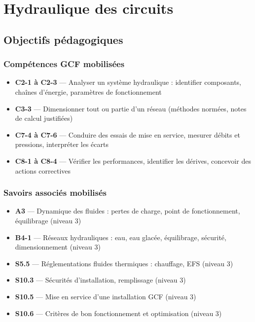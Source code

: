 \chapter{Hydraulique des circuits}

\section{Objectifs pédagogiques}

\subsection*{Compétences GCF mobilisées}
\begin{itemize}
  \item \textbf{C2-1 à C2-3} — Analyser un système hydraulique : identifier composants, chaînes d'énergie, paramètres de fonctionnement
  \item \textbf{C3-3} — Dimensionner tout ou partie d'un réseau (méthodes normées, notes de calcul justifiées)
  \item \textbf{C7-4 à C7-6} — Conduire des essais de mise en service, mesurer débits et pressions, interpréter les écarts
  \item \textbf{C8-1 à C8-4} — Vérifier les performances, identifier les dérives, concevoir des actions correctives
\end{itemize}

\subsection*{Savoirs associés mobilisés}
\begin{itemize}
  \item \textbf{A3} — Dynamique des fluides : pertes de charge, point de fonctionnement, équilibrage (niveau 3)
  \item \textbf{B4-1} — Réseaux hydrauliques : eau, eau glacée, équilibrage, sécurité, dimensionnement (niveau 3)
  \item \textbf{S5.5} — Réglementations fluides thermiques : chauffage, EFS (niveau 3)
  \item \textbf{S10.3} — Sécurités d'installation, remplissage (niveau 3)
  \item \textbf{S10.5} — Mise en service d'une installation GCF (niveau 3)
  \item \textbf{S10.6} — Critères de bon fonctionnement et optimisation (niveau 3)
\end{itemize}

